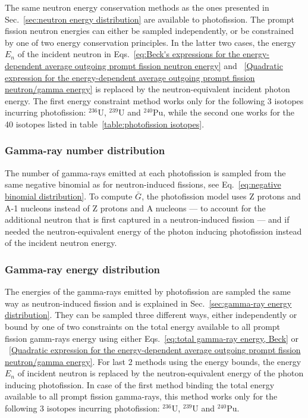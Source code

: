 %

The same neutron energy conservation methods as the ones 
presented in Sec.~\ref{sec:neutron energy distribution} are 
available to photofission. The prompt fission neutron energies can
either be sampled independently, or be constrained by one of two 
energy conservation principles. In the latter two cases, the energy 
$E_n$ of the incident neutron in Eqs.~\ref{eq:Beck's expressions 
for the energy-dependent average outgoing prompt fission neutron 
energy} and ~\ref{Quadratic expression for the energy-dependent average outgoing prompt fission neutron/gamma energy} is replaced by the neutron-equivalent 
incident photon energy. The first energy constraint method works
only for the following 3 isotopes incurring photofission: $^{236}$U, 
$^{239}$U and $^{240}$Pu, while the second one works for the 40
isotopes listed in table~\ref{table:photofission isotopes}.

\subsubsection*{Gamma-ray number distribution}\label{sec:gamma-ray number distribution for photofission}

The number of gamma-rays emitted at each photofission is sampled from
the same negative binomial as for neutron-induced fissions, see 
Eq.~\ref{eq:negative binomial distribution}. To compute $\bar{G}$,
the photofission model uses Z protons and A-1 nucleons instead of 
Z protons and A nucleons --- to account for the additional neutron that 
is first captured in a neutron-induced fission --- and if needed the 
neutron-equivalent energy of the photon inducing photofission
instead of the incident neutron energy.

\subsubsection*{Gamma-ray energy distribution}\label{sec:gamma-ray energy distribution for photofission}

The energies of the gamma-rays emitted by photofission are sampled
the same way as neutron-induced fission and is explained in 
Sec.~\ref{sec:gamma-ray energy distribution}. They can be sampled
three different ways, either independently or bound by one of two 
constraints on the total energy available to all prompt fission
gamm-rays energy using either Eqs.~\ref{eq:total gamma-ray energy, Beck} 
or ~\ref{Quadratic expression for the energy-dependent average outgoing prompt fission neutron/gamma energy}.
For last 2 methods using the energy bounds, the energy $E_n$ of 
incident neutron is replaced by the neutron-equivalent energy of 
the photon inducing photofission. In case of the first method 
binding the total energy available to all prompt fission 
gamma-rays, this method works only for the following 3 isotopes 
incurring photofission: $^{236}$U, $^{239}$U and $^{240}$Pu.

